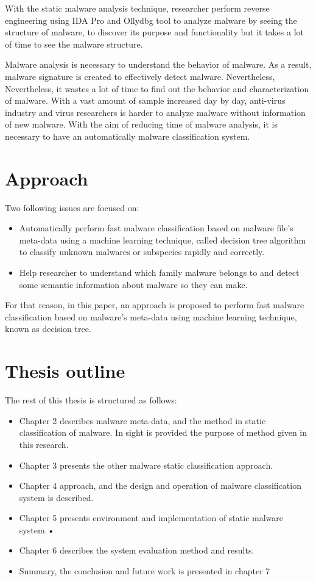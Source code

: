 With the static malware analysis technique, researcher perform reverse engineering using IDA Pro and Ollydbg tool to analyze malware by seeing the structure of malware, to discover its purpose and functionality but it takes a lot of time to see the malware structure. 

Malware analysis is necessary to understand the behavior of malware. As a result, malware signature is created to effectively detect malware. Nevertheless, Nevertheless, it wastes a lot of time to find out the behavior and characterization of malware.
With a vast amount of sample increased day by day, anti-virus industry and virus researchers is harder to analyze malware without information of new malware. With the aim of reducing time of malware analysis, it is necessary to have an automatically malware classification system.


\section{Approach}Two following issues are focused on:
\begin{itemize}
\item Automatically perform fast malware classification based on malware file's meta-data using a machine learning technique, called decision tree algorithm to classify unknown malwares or subspecies rapidly and correctly.
\item Help researcher to understand which family malware belongs to and detect some semantic information about malware so they can make.
\end{itemize}

For that reason, in this paper, an approach is proposed to perform fast malware classification based on malware's meta-data using machine learning technique, known as decision tree.

\section{Thesis outline}
The rest of this thesis is structured as follows: \begin{itemize}
\item Chapter 2 describes malware meta-data, and the method in static classification of malware. In sight is provided the purpose of method given in this research.
\item Chapter 3 presents the other malware static classification approach.
\item Chapter 4 approach, and the design and operation of malware classification system is described.
\item Chapter 5 presents environment and implementation of static malware system.\textsl{•} 
\item Chapter 6 describes the system evaluation method and results. 
\item Summary, the conclusion and future work is presented in chapter 7
\end{itemize}
